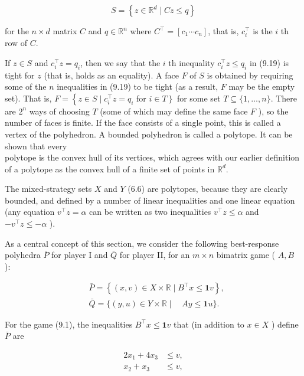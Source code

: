 \documentclass[12pt]{article}
\begin{document}
\begin{equation*}
S=\left\{z \in \mathbb{R}^{d} \mid C z \leq q\right\} \tag{9.19}
\end{equation*}


for the $n \times d$ matrix $C$ and $q \in \mathbb{R}^{n}$ where $C^{\top}=\left[c_{1} \cdots c_{n}\right]$, that is, $c_{i}^{\top}$ is the $i$ th row of $C$.

If $z \in S$ and $c_{i}^{\top} z=q_{i}$, then we say that the $i$ th inequality $c_{i}^{\top} z \leq q_{i}$ in (9.19) is tight for $z$ (that is, holds as an equality). A face $F$ of $S$ is obtained by requiring some of the $n$ inequalities in (9.19) to be tight (as a result, $F$ may be the empty set). That is, $F=\left\{z \in S \mid c_{i}^{\top} z=q_{i}\right.$ for $\left.i \in T\right\}$ for some set $T \subseteq\{1, \ldots, n\}$. There are $2^{n}$ ways of choosing $T$ (some of which may define the same face $F$ ), so the number of faces is finite. If the face consists of a single point, this is called a vertex of the polyhedron. A bounded polyhedron is called a polytope. It can be shown that every\\
polytope is the convex hull of its vertices, which agrees with our earlier definition of a polytope as the convex hull of a finite set of points in $\mathbb{R}^{d}$.

The mixed-strategy sets $X$ and $Y$ (6.6) are polytopes, because they are clearly bounded, and defined by a number of linear inequalities and one linear equation (any equation $v^{\top} z=\alpha$ can be written as two inequalities $v^{\top} z \leq \alpha$ and $-v^{\top} z \leq-\alpha$ ).

As a central concept of this section, we consider the following best-response polyhedra $\bar{P}$ for player I and $\bar{Q}$ for player II, for an $m \times n$ bimatrix game ( $A, B$ ):


\begin{align*}
& \bar{P}=\left\{(x, v) \in X \times \mathbb{R} \mid B^{\top} x \leq \mathbf{1} v\right\}, \\
& \bar{Q}=\{(y, u) \in Y \times \mathbb{R} \mid \quad A y \leq \mathbf{1} u\} . \tag{9.20}
\end{align*}


For the game (9.1), the inequalities $B^{\top} x \leq \mathbf{1} v$ that (in addition to $x \in X$ ) define $\bar{P}$ are


\begin{align*}
2 x_{1}+4 x_{3} & \leq v,  \tag{9.21}\\
x_{2}+x_{3} & \leq v,
\end{align*}
\end{document}
